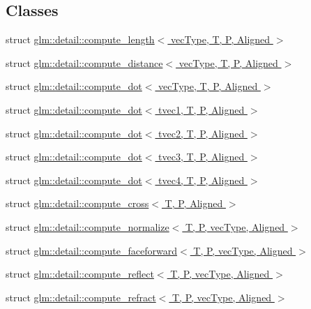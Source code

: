 \subsection*{Classes}
\begin{DoxyCompactItemize}
\item 
struct \hyperlink{structglm_1_1detail_1_1compute__length}{glm\+::detail\+::compute\+\_\+length$<$ vec\+Type, T, P, Aligned $>$}
\item 
struct \hyperlink{structglm_1_1detail_1_1compute__distance}{glm\+::detail\+::compute\+\_\+distance$<$ vec\+Type, T, P, Aligned $>$}
\item 
struct \hyperlink{structglm_1_1detail_1_1compute__dot}{glm\+::detail\+::compute\+\_\+dot$<$ vec\+Type, T, P, Aligned $>$}
\item 
struct \hyperlink{structglm_1_1detail_1_1compute__dot_3_01tvec1_00_01T_00_01P_00_01Aligned_01_4}{glm\+::detail\+::compute\+\_\+dot$<$ tvec1, T, P, Aligned $>$}
\item 
struct \hyperlink{structglm_1_1detail_1_1compute__dot_3_01tvec2_00_01T_00_01P_00_01Aligned_01_4}{glm\+::detail\+::compute\+\_\+dot$<$ tvec2, T, P, Aligned $>$}
\item 
struct \hyperlink{structglm_1_1detail_1_1compute__dot_3_01tvec3_00_01T_00_01P_00_01Aligned_01_4}{glm\+::detail\+::compute\+\_\+dot$<$ tvec3, T, P, Aligned $>$}
\item 
struct \hyperlink{structglm_1_1detail_1_1compute__dot_3_01tvec4_00_01T_00_01P_00_01Aligned_01_4}{glm\+::detail\+::compute\+\_\+dot$<$ tvec4, T, P, Aligned $>$}
\item 
struct \hyperlink{structglm_1_1detail_1_1compute__cross}{glm\+::detail\+::compute\+\_\+cross$<$ T, P, Aligned $>$}
\item 
struct \hyperlink{structglm_1_1detail_1_1compute__normalize}{glm\+::detail\+::compute\+\_\+normalize$<$ T, P, vec\+Type, Aligned $>$}
\item 
struct \hyperlink{structglm_1_1detail_1_1compute__faceforward}{glm\+::detail\+::compute\+\_\+faceforward$<$ T, P, vec\+Type, Aligned $>$}
\item 
struct \hyperlink{structglm_1_1detail_1_1compute__reflect}{glm\+::detail\+::compute\+\_\+reflect$<$ T, P, vec\+Type, Aligned $>$}
\item 
struct \hyperlink{structglm_1_1detail_1_1compute__refract}{glm\+::detail\+::compute\+\_\+refract$<$ T, P, vec\+Type, Aligned $>$}
\end{DoxyCompactItemize}
